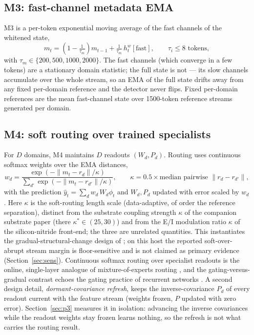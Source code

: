\documentclass[preprint,12pt]{elsarticle}
\begin{document}
\subsection{M3: fast-channel metadata EMA}
\label{sec:m3}

M3 is a per-token exponential moving average of the fast channels of the
whitened state,
\begin{equation}
m_t = \left(1 - \tfrac{1}{\tau_m}\right) m_{t-1} +
\tfrac{1}{\tau_m}\, h^w_t[\mathrm{fast}], \qquad \tau_i \le 8
\text{ tokens},
\label{eq:ema}
\end{equation}
with $\tau_m \in \{200,500,1000,2000\}$. The fast channels (which
converge in a few tokens) are a stationary domain statistic; the full
state is not --- its slow channels accumulate over the whole stream, so
an EMA of the full state drifts away from any fixed per-domain reference
and the detector never flips.
Fixed per-domain references are the mean fast-channel state over
1500-token reference streams generated per domain.

\subsection{M4: soft routing over trained specialists}
\label{sec:m4}

For $D$ domains, M4 maintains $D$ readouts $(W_d, P_d)$. Routing uses
continuous softmax weights over the EMA distances,
\begin{equation}
w_d = \frac{\exp(-\|m_t - r_d\|/\kappa)}{\sum_{d'}
\exp(-\|m_t - r_{d'}\|/\kappa)},
\qquad \kappa = 0.5 \times \text{median pairwise }\|r_d - r_{d'}\|,
\label{eq:soft}
\end{equation}
with the prediction $\hat{y}_t = \sum_d w_d\, W_d \phi_t$ and
$W_d, P_d$ updated with error scaled by $w_d$. Here $\kappa$ is the
soft-routing length scale (data-adaptive, of order the reference
separation), distinct from the substrate coupling strength $\kappa$ of the
companion substrate paper \cite{redema} (there $\kappa^{*}\in(25,30)$) and
from the E/I modulation ratio $\kappa$ of the silicon-nitride front-end;
the three are unrelated quantities. This instantiates the
gradual-structural-change design of \cite{redemc}; on this host the
reported soft-over-abrupt stream margin is floor-sensitive and is not
claimed as primary evidence (Section~\ref{sec:sens}).
Continuous softmax routing over specialist readouts is the online,
single-layer analogue of mixture-of-experts routing
\cite{shazeer2017moe}, and the gating-versus-gradual contrast echoes
the gating practice of recurrent networks \cite{hochreiter1997lstm}.
A second design detail, \emph{dormant-covariance refresh}, keeps the
inverse-covariance $P_d$ of every readout current with the feature stream
(weights frozen, $P$ updated with zero error). Section~\ref{sec:p3}
measures it in isolation: advancing the inverse covariances while the
readout weights stay frozen learns nothing, so the refresh is not what
carries the routing result.
\end{document}
